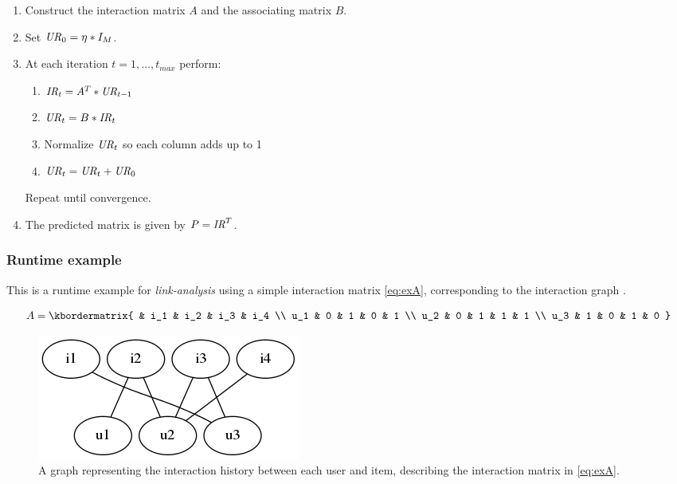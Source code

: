 \begin{enumerate}
    \item Construct the interaction matrix $A$ and the associating matrix $B$.

    \item Set $\mathit{UR}_0 = \eta * I_M$.
    \item At each iteration $t = 1, \ldots, t_{max}$ perform:

        \begin{enumerate}
            \item $\mathit{IR}_t = A^T * \mathit{UR}_{t- 1}$
            \item $\mathit{UR}_t = B * \mathit{IR}_t$
            \item Normalize $\mathit{UR}_t$ so each column adds up to 1
            \item $\mathit{UR}_t = \mathit{UR}_t + \mathit{UR}_0$
        \end{enumerate}

        Repeat until convergence.

    \item The predicted matrix is given by $P = \mathit{IR}^T$.

\end{enumerate}

\newpage
\subsubsection{Runtime example}

This is a runtime example for \textit{link-analysis} using a simple interaction matrix \eqref{eq:exA}, corresponding to the interaction graph .

\begin{equation}\label{eq:exA}
  A = \kbordermatrix{
    &    i_1 & i_2 & i_3 & i_4 \\
    u_1 & 0   & 1   & 0   & 1  \\
    u_2 & 0   & 1   & 1   & 1  \\
    u_3 & 1   & 0   & 1   & 0
  }
\end{equation}

\begin{figure}[h!]
    \centering
    \includegraphics[width=0.3\linewidth]{fig/example_run/item_user_graph.png}
    \caption{A graph representing the interaction history between each user and item, describing the interaction matrix in \eqref{eq:exA}.}
    \label{fig:ex_graph}
\end{figure}

